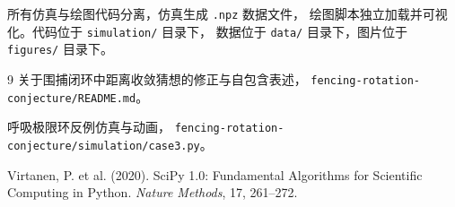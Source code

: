 \documentclass[11pt,a4paper]{article}
\begin{document}
所有仿真与绘图代码分离，仿真生成 \texttt{.npz} 数据文件，
绘图脚本独立加载并可视化。代码位于 \texttt{simulation/} 目录下，
数据位于 \texttt{data/} 目录下，图片位于 \texttt{figures/} 目录下。

\begin{thebibliography}{9}
关于围捕闭环中距离收敛猜想的修正与自包含表述，
\texttt{fencing-rotation-conjecture/README.md}。

呼吸极限环反例仿真与动画，
\texttt{fencing-rotation-conjecture/simulation/case3.py}。

Virtanen, P. et al. (2020). SciPy 1.0: Fundamental Algorithms for
Scientific Computing in Python. \textit{Nature Methods}, 17, 261--272.
\end{thebibliography}
\end{document}
